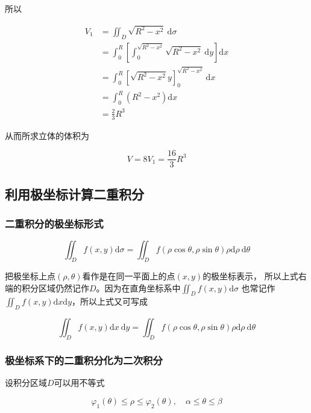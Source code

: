 \documentclass[12pt, a4paper]{article}
\numberwithin{equation}{section}
\newcommand{\rmd}{\mathrm{d}}
\begin{document}
    所以

    $$
        \begin{aligned}
            V_1 & =\iint_D \sqrt{R^2-x^2} \mathrm{~d} \sigma \\
            & =\int_0^R\left[\int_0^{\sqrt{R^2-x^2}} \sqrt{R^2-x^2} \mathrm{~d} y\right] \mathrm{d} x \\
            & =\int_0^R\left[\sqrt{R^2-x^2} y\right]_0^{\sqrt{R^2-x^2}} \mathrm{~d} x \\
            & =\int_0^R\left(R^2-x^2\right) \mathrm{d} x \\
            & =\frac{2}{3} R^3
        \end{aligned}
    $$

    从而所求立体的体积为

    $$
        V=8 V_1=\frac{16}{3} R^3
    $$

\subsection{利用极坐标计算二重积分}

\subsubsection{二重积分的极坐标形式}

    $$
        \iint_D f(x, y) \mathrm{d} \sigma=\iint_D f(\rho \cos \theta, \rho \sin \theta) \rho \mathrm{d} \rho \mathrm{~d} \theta
    $$

    把极坐标上点\(\left(\rho, \theta\right)\)看作是在同一平面上的点\(\left(x,y\right)\)的极坐标表示，
    所以上式右端的积分区域仍然记作\(D \)。因为在直角坐标系中\({\displaystyle \iint_{D }f\left(x,y\right)\rmd \sigma}\)
    也常记作\({\displaystyle \iint_{D }f\left(x,y\right)\rmd x \rmd y}\)，所以上式又可写成

    \begin{equation}
        \iint_D f(x, y) \mathrm{d} x \mathrm{~d} y=\iint_D f(\rho \cos \theta, \rho \sin \theta) \rho \mathrm{d} \rho \mathrm{~d} \theta
        \label{10-2-6}
    \end{equation}

\subsubsection{极坐标系下的二重积分化为二次积分}

    设积分区域$D$可以用不等式

    $$
        \varphi_1(\theta) \leq \rho \leq \varphi_2(\theta), \quad \alpha \leq \theta \leq \beta
    $$
\end{document}
